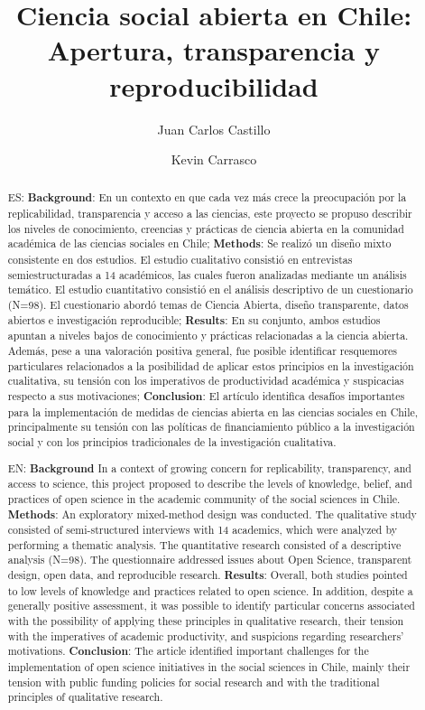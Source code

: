 \documentclass[
  letterpaper,
  DIV=11,
  numbers=noendperiod]{scrreprt}
\title{Ciencia social abierta en Chile: Apertura, transparencia y
reproducibilidad}
\author{Juan Carlos Castillo \and Kevin Carrasco}
\date{}
\begin{document}
\maketitle
\begin{abstract}
ES: \textbf{Background}: En un contexto en que cada vez más crece la
preocupación por la replicabilidad, transparencia y acceso a las
ciencias, este proyecto se propuso describir los niveles de
conocimiento, creencias y prácticas de ciencia abierta en la comunidad
académica de las ciencias sociales en Chile; \textbf{Methods}: Se
realizó un diseño mixto consistente en dos estudios. El estudio
cualitativo consistió en entrevistas semiestructuradas a 14 académicos,
las cuales fueron analizadas mediante un análisis temático. El estudio
cuantitativo consistió en el análisis descriptivo de un cuestionario
(N=98). El cuestionario abordó temas de Ciencia Abierta, diseño
transparente, datos abiertos e investigación reproducible;
\textbf{Results}: En su conjunto, ambos estudios apuntan a niveles bajos
de conocimiento y prácticas relacionadas a la ciencia abierta. Además,
pese a una valoración positiva general, fue posible identificar
resquemores particulares relacionados a la posibilidad de aplicar estos
principios en la investigación cualitativa, su tensión con los
imperativos de productividad académica y suspicacias respecto a sus
motivaciones; \textbf{Conclusion}: El artículo identifica desafíos
importantes para la implementación de medidas de ciencias abierta en las
ciencias sociales en Chile, principalmente su tensión con las políticas
de financiamiento público a la investigación social y con los principios
tradicionales de la investigación cualitativa.

EN: \textbf{Background} In a context of growing concern for
replicability, transparency, and access to science, this project
proposed to describe the levels of knowledge, belief, and practices of
open science in the academic community of the social sciences in Chile.
\textbf{Methods}: An exploratory mixed-method design was conducted. The
qualitative study consisted of semi-structured interviews with 14
academics, which were analyzed by performing a thematic analysis. The
quantitative research consisted of a descriptive analysis (N=98). The
questionnaire addressed issues about Open Science, transparent design,
open data, and reproducible research. \textbf{Results}: Overall, both
studies pointed to low levels of knowledge and practices related to open
science. In addition, despite a generally positive assessment, it was
possible to identify particular concerns associated with the possibility
of applying these principles in qualitative research, their tension with
the imperatives of academic productivity, and suspicions regarding
researchers' motivations. \textbf{Conclusion}: The article identified
important challenges for the implementation of open science initiatives
in the social sciences in Chile, mainly their tension with public
funding policies for social research and with the traditional principles
of qualitative research.
\end{abstract}
\end{document}
